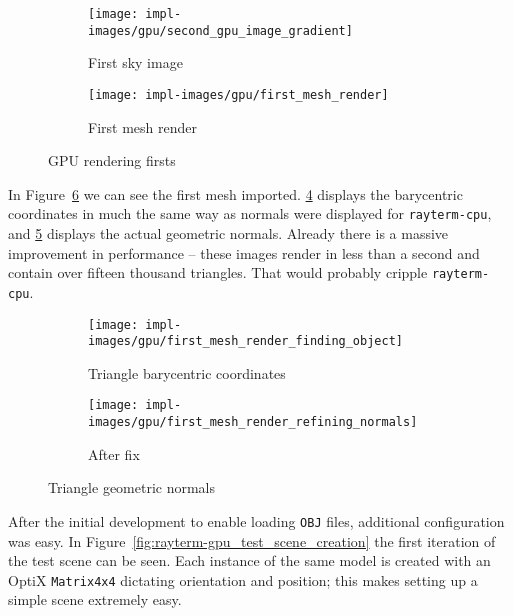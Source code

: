 \vspace{0.3em}
\begin{figure}[htb]
  \centering
  \begin{subfigure}[htb]{0.4\textwidth}
    \texttt{[image: impl-images/gpu/second\_gpu\_image\_gradient]}
    \caption{First sky image}
    \label{fig:rayterm-gpu_first_rendered_image}
  \end{subfigure}
  \begin{subfigure}[htb]{0.4\textwidth}
    \texttt{[image: impl-images/gpu/first\_mesh\_render]}
    \caption{First mesh render}
    \label{fig:rayterm-gpu_first_mesh_render}
  \end{subfigure}
  \caption{GPU rendering firsts}
  \label{fig:rayterm-gpu_basics}
\end{figure}

In Figure~\ref{fig:rayterm-gpu_mesh} we can see the first mesh imported.
\ref{fig:rayterm-gpu_barycentric_coordinates} displays the barycentric coordinates in much the same way as normals were displayed for \texttt{rayterm-cpu}, and \ref{fig:rayterm-gpu_geometric_normals} displays the actual geometric normals.
Already there is a massive improvement in performance -- these images render in less than a second and contain over fifteen thousand triangles.
That would probably cripple \texttt{rayterm-cpu}.

\vspace{0.3em}
\begin{figure}[htb]
  \centering
  \begin{subfigure}[htb]{0.45\textwidth}
    \texttt{[image: impl-images/gpu/first\_mesh\_render\_finding\_object]}
    \caption{Triangle barycentric coordinates}
    \label{fig:rayterm-gpu_barycentric_coordinates}
  \end{subfigure}
  \begin{subfigure}[htb]{0.45\textwidth}
    \texttt{[image: impl-images/gpu/first\_mesh\_render\_refining\_normals]}
    \caption{After fix}
    \label{fig:rayterm-gpu_geometric_normals}
  \end{subfigure}
  \caption{Triangle geometric normals}
  \label{fig:rayterm-gpu_mesh}
\end{figure}

After the initial development to enable loading \texttt{OBJ} files, additional configuration was easy.
In Figure~\ref{fig:rayterm-gpu_test_scene_creation} the first iteration of the test scene can be seen.
Each instance of the same model is created with an OptiX \texttt{Matrix4x4} dictating orientation and position; this makes setting up a simple scene extremely easy.

